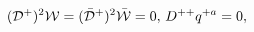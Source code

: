 \begin{equation}
\label{onsh} ({\cal
D}^+)^2{\cal W}=(\bar{\cal D}^+)^2\bar{\cal W} = 0,\, {D}^{++}q^{+a}=0,
\end{equation}


